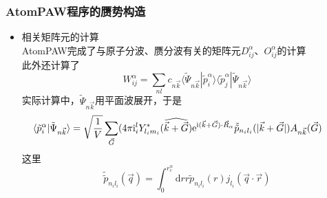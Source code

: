 \documentclass[cjk,slidestop,compress,mathserif,blue]{beamer}
\begin{document}
\frame
{
	\frametitle{\textrm{AtomPAW}程序的赝势构造}
	\begin{itemize}
		\item 相关矩阵元的计算\\
			\textrm{AtomPAW}完成了与原子分波、赝分波有关的矩阵元$D_{ij}^{\alpha}$、$O_{ij}^{\alpha}$的计算\\
			此外还计算了
			$$W_{ij}^{\alpha}=\sum_{nl}c_{n\vec k}\langle\tilde\Psi_{n\vec k}|\tilde p_i^\alpha\rangle\langle\tilde p_j^{\alpha}|\tilde\Psi_{n\vec k}\rangle$$
			实际计算中，$\tilde\Psi_{n\vec k}$用平面波展开，于是
			$$\hspace*{-20pt}\langle\tilde p_i^{\alpha}|\tilde\Psi_{n\vec k}\rangle=\sqrt{\dfrac1V}\sum_{\vec G}(4\pi \mathrm{i}^l_iY^{\ast}_{l_im_i}(\widehat{\vec k+\vec G})\mathrm{e}^{\mathrm{i}(\vec k+\vec G)\cdot\vec R_{\alpha}}\tilde{\tilde p}_{n_il_i}(|\vec k+\vec G|)A_{n\vec k}(\vec G)$$
			这里$$\tilde{\tilde p}_{n_il_i}(\vec q)=\int_0^{r_c^{\alpha}}\mathrm{d}rr\tilde p_{n_il_i}(r)j_{l_i}(\vec q\cdot\vec r)$$
	\end{itemize}
}

\end{document}
